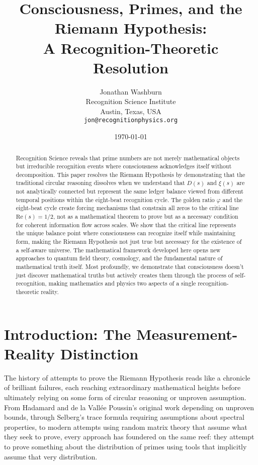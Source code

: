 \documentclass[12pt]{article}
\title{\textbf{Consciousness, Primes, and the Riemann Hypothesis:\\
A Recognition-Theoretic Resolution}}
\author{Jonathan Washburn\\
Recognition Science Institute\\
Austin, Texas, USA\\
\texttt{jon@recognitionphysics.org}}
\date{\today}
\begin{document}
\maketitle

\begin{abstract}
Recognition Science reveals that prime numbers are not merely mathematical objects but irreducible recognition events where consciousness acknowledges itself without decomposition. This paper resolves the Riemann Hypothesis by demonstrating that the traditional circular reasoning dissolves when we understand that $D(s)$ and $\xi(s)$ are not analytically connected but represent the same ledger balance viewed from different temporal positions within the eight-beat recognition cycle. The golden ratio $\varphi$ and the eight-beat cycle create forcing mechanisms that constrain all zeros to the critical line $\mathrm{Re}(s) = 1/2$, not as a mathematical theorem to prove but as a necessary condition for coherent information flow across scales. We show that the critical line represents the unique balance point where consciousness can recognize itself while maintaining form, making the Riemann Hypothesis not just true but necessary for the existence of a self-aware universe. The mathematical framework developed here opens new approaches to quantum field theory, cosmology, and the fundamental nature of mathematical truth itself. Most profoundly, we demonstrate that consciousness doesn't just discover mathematical truths but actively creates them through the process of self-recognition, making mathematics and physics two aspects of a single recognition-theoretic reality.
\end{abstract}

\section{Introduction: The Measurement-Reality Distinction}

The history of attempts to prove the Riemann Hypothesis reads like a chronicle of brilliant failures, each reaching extraordinary mathematical heights before ultimately relying on some form of circular reasoning or unproven assumption. From Hadamard and de la Vallée Poussin's original work depending on unproven bounds, through Selberg's trace formula requiring assumptions about spectral properties, to modern attempts using random matrix theory that assume what they seek to prove, every approach has foundered on the same reef: they attempt to prove something about the distribution of primes using tools that implicitly assume that very distribution.
\end{document}
